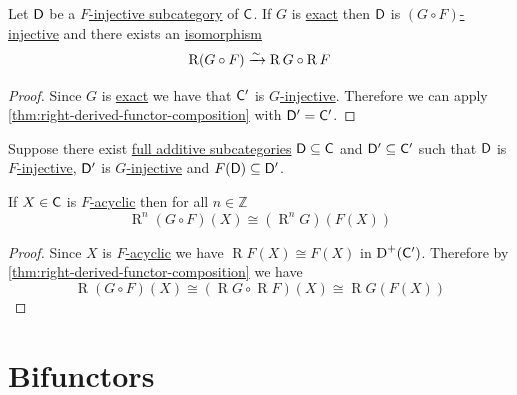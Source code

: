 \documentclass[../../main]{subfiles}
\begin{document}
\begin{corollary}
  Let \(\mathsf{D}\) be a \hyperref[def:F-injective-subcategory]{\(F\)-injective subcategory} of \(\mathsf{C}\).
  If \(G\) is \hyperref[def:exact-functor]{exact} then \(\mathsf{D}\) is \hyperref[def:F-injective-subcategory]{\((G \circ F)\)-injective} and there exists an \hyperref[def:categorical-isomorphism]{isomorphism}
  \begin{equation*}
    \operatorname{R}(G \circ F) \xrightarrow{\sim} \operatorname{R}G \circ \operatorname{R}F
  \end{equation*}
\end{corollary}
\begin{proof}
  Since \(G\) is \hyperref[def:exact-functor]{exact} we have that \(\mathsf{C'}\) is \hyperref[def:F-injective-subcategory]{\(G\)-injective}.
  Therefore we can apply \autoref{thm:right-derived-functor-composition} with \(\mathsf{D'} = \mathsf{C'}\).
\end{proof}

\begin{corollary}
  Suppose there exist \hyperref[def:full-additive-subcategory]{full additive subcategories} \(\mathsf{D} \subseteq \mathsf{C}\) and \(\mathsf{D'} \subseteq \mathsf{C'}\) such that \(\mathsf{D}\) is \hyperref[def:F-injective-subcategory]{\(F\)-injective}, \(\mathsf{D'}\) is \hyperref[def:F-injective-subcategory]{\(G\)-injective} and \(F(\mathsf{D}) \subseteq \mathsf{D'}\).

  If \(X \in \mathsf{C}\) is \hyperref[def:F-acyclic-object]{\(F\)-acyclic} then for all \(n \in \mathbb{Z}\)
  \begin{equation*}
    \operatorname{R}^{n}(G \circ F)(X) \cong (\operatorname{R}^{n}G)(F(X))
  \end{equation*}
\end{corollary}
\begin{proof}
  Since \(X\) is \hyperref[def:F-acyclic-object]{\(F\)-acyclic} we have \(\operatorname{R}F(X) \cong F(X)\) in \(\operatorname{D}^{+}(\mathsf{C'})\).
  Therefore by \autoref{thm:right-derived-functor-composition} we have
  \begin{equation*}
    \operatorname{R}(G \circ F)(X) \cong \left( \operatorname{R}G \circ \operatorname{R}F \right)(X) \cong \operatorname{R}G(F(X))
  \end{equation*}
\end{proof}

\section{Bifunctors}
\end{document}
